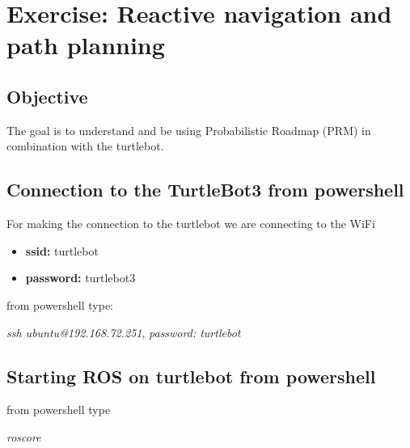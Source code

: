 \documentclass[12pt,a4paper]{article}
\begin{document}
	
	\clearpage
	\section{Exercise: Reactive navigation and path planning}
	
	\subsection{Objective}
	The goal is to understand and be using Probabilistic Roadmap (PRM) in combination with the turtlebot.
	
	\subsection{Connection to the TurtleBot3 from powershell}
	For making the connection to the turtlebot we are connecting to the WiFi 
	\begin{itemize}
		\item \textbf{ssid:} turtlebot
		\item \textbf{password:} turtlebot3
	\end{itemize}
	from powershell type:
	\begin{center}
		\textit{ssh ubuntu@192.168.72.251}, \textit{password: turtlebot}
	\end{center}
	\subsection{Starting ROS on turtlebot from powershell}
	from powershell type
	\begin{center}
		\textit{roscore}
	\end{center}
\end{document}
